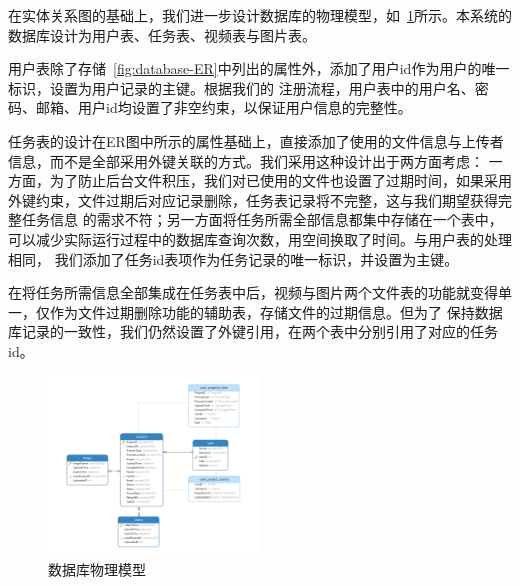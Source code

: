在实体关系图的基础上，我们进一步设计数据库的物理模型，如~\ref{fig:database-design}所示。本系统的数据库设计为用户表、任务表、视频表与图片表。

用户表除了存储~\ref{fig:database-ER}中列出的属性外，添加了用户id作为用户的唯一标识，设置为用户记录的主键。根据我们的
注册流程，用户表中的用户名、密码、邮箱、用户id均设置了非空约束，以保证用户信息的完整性。

任务表的设计在ER图中所示的属性基础上，直接添加了使用的文件信息与上传者信息，而不是全部采用外键关联的方式。我们采用这种设计出于两方面考虑：
一方面，为了防止后台文件积压，我们对已使用的文件也设置了过期时间，如果采用外键约束，文件过期后对应记录删除，任务表记录将不完整，这与我们期望获得完整任务信息
的需求不符；另一方面将任务所需全部信息都集中存储在一个表中，可以减少实际运行过程中的数据库查询次数，用空间换取了时间。与用户表的处理相同，
我们添加了任务id表项作为任务记录的唯一标识，并设置为主键。

在将任务所需信息全部集成在任务表中后，视频与图片两个文件表的功能就变得单一，仅作为文件过期删除功能的辅助表，存储文件的过期信息。但为了
保持数据库记录的一致性，我们仍然设置了外键引用，在两个表中分别引用了对应的任务id。

\begin{figure}[ht]
    \centering
    \includegraphics[width=0.5\textwidth]{source/img/database_design.png}
    \caption{数据库物理模型}
    \label{fig:database-design}
\end{figure}
